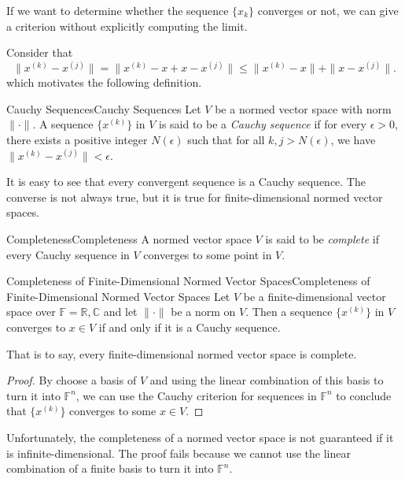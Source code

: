 \documentclass[../main.tex]{subfiles}
\begin{document}
If we want to determine whether the sequence $\{x_k\}$ converges or not, we can give a criterion without explicitly computing the limit.

Consider that
\begin{equation*}
  \|x^{(k)} - x^{(j)}\| = \|x^{(k)} - x + x - x^{(j)}\| \leq \|x^{(k)} - x\| + \|x - x^{(j)}\|.
\end{equation*}
which motivates the following definition.

\begin{definition}{Cauchy Sequences}{Cauchy Sequences}
  Let $V$ be a normed vector space with norm $\|\cdot\|$. A sequence $\{x^{(k)}\}$ in $V$ is said to be a \textit{Cauchy sequence} if for every $\epsilon > 0$, there exists a positive integer $N(\epsilon)$ such that for all $k, j > N(\epsilon)$, we have $\|x^{(k)} - x^{(j)}\| < \epsilon$.
\end{definition}
It is easy to see that every convergent sequence is a Cauchy sequence. The converse is not always true, but it is true for finite-dimensional normed vector spaces.

\begin{definition}{Completeness}{Completeness}
  A normed vector space $V$ is said to be \textit{complete} if every Cauchy sequence in $V$ converges to some point in $V$.
\end{definition}

\begin{theorem}{Completeness of Finite-Dimensional Normed Vector Spaces}{Completeness of Finite-Dimensional Normed Vector Spaces}
  Let $V$ be a finite-dimensional vector space over $\mathbb{F} = \mathbb{R}, \mathbb{C}$ and let $\|\cdot\|$ be a norm on $V$. Then a sequence $\{x^{(k)}\}$ in $V$ converges to $x \in V$ if and only if it is a Cauchy sequence.

  That is to say, every finite-dimensional normed vector space is complete.
\end{theorem}
\begin{proof}
  By choose a basis of $V$ and using the linear combination of this basis to turn it into $\mathbb{F}^n$, we can use the Cauchy criterion for sequences in $\mathbb{F}^n$ to conclude that $\{x^{(k)}\}$ converges to some $x \in V$.
\end{proof}

\begin{remark}
  Unfortunately, the completeness of a normed vector space is not guaranteed if it is infinite-dimensional. The proof fails because we cannot use the linear combination of a finite basis to turn it into $\mathbb{F}^n$.
\end{remark}
\end{document}
